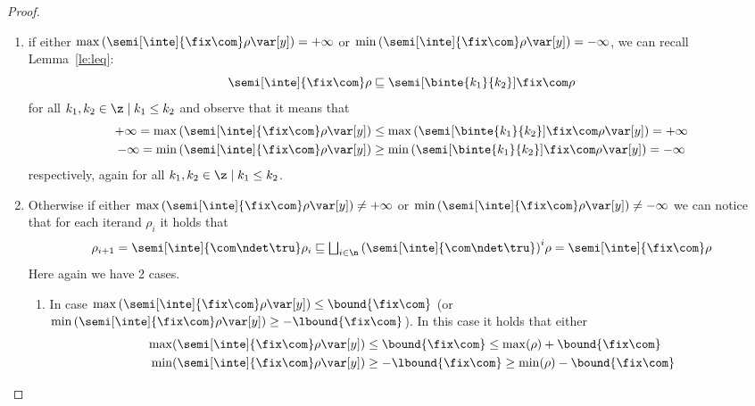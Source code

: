 \begin{proof}
  \begin{enumerate}[label=(\roman*)]
  \item if either
    \({\max\left(\semi[\inte]{\fix\com}\rho\var[y]\right) = +\infty}\)
    or
    \({\min\left(\semi[\inte]{\fix\com}\rho\var[y]\right) =
      -\infty}\), we can recall Lemma~\ref{le:leq}:
    \begin{equation*}
      \semi[\inte]{\fix\com}\rho \sqsubseteq \semi[\binte{k_1}{k_2}]{\fix\com}\rho
    \end{equation*}
    for all \(k_1,k_2 \in \z \mid k_1 \leq k_2\) and observe that it
    means that
    \begin{align*}
      +\infty = \max\left(\semi[\inte]{\fix\com}\rho\var[y]\right) & \leq \max\left(\semi[\binte{k_1}{k_2}]{\fix\com}\rho\var[y]\right) = +\infty \\
      -\infty = \min\left(\semi[\inte]{\fix\com}\rho\var[y]\right) & \geq \min\left(\semi[\binte{k_1}{k_2}]{\fix\com}\rho\var[y]\right) = -\infty
    \end{align*}
    respectively, again for all \(k_1,k_2 \in \z \mid k_1 \leq
    k_2\).
  \item Otherwise if either
    \({\max\left(\semi[\inte]{\fix\com}\rho\var[y]\right) \neq
      +\infty}\) or
    \({\min\left(\semi[\inte]{\fix\com}\rho\var[y]\right) \neq
      -\infty}\) we can notice that for each iterand
    \(\rho_i\) it holds that
    \begin{equation*}
      \rho_{i+1} = \semi[\inte]{\com \ndet \tru}\rho_i
      \sqsubseteq
      \textstyle\bigsqcup_{i\in\n} {\left(\semi[\inte]{\com \ndet \tru}\right)}^i\rho
      =
      \semi[\inte]{\fix\com}\rho
    \end{equation*}
    Here again we have 2 cases.
    \begin{enumerate}[label=(\alph*)]
    \item In case
      \(\max\left(\semi[\inte]{\fix\com}\rho\var[y]\right) \leq
      \bound{\fix\com}\) (or
      \(\min\left(\semi[\inte]{\fix\com}\rho\var[y]\right) \geq
      -\lbound{\fix\com}\)). In this case it holds that either
      \begin{align*}
        \max(\semi[\inte]{\fix\com}\rho\var[y]) & \leq \bound{\fix\com} \leq \max(\rho) + \bound{\fix\com} \\
        \min(\semi[\inte]{\fix\com}\rho\var[y]) & \geq - \lbound{\fix\com} \geq \min(\rho) - \bound{\fix\com}
      \end{align*}


\end{enumerate}
\end{enumerate}
\end{proof}

